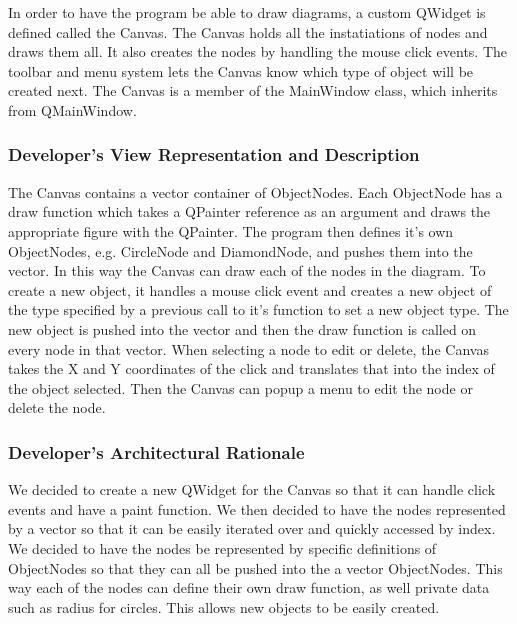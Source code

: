 \documentclass[twoside,letterpaper]{article}
\begin{document}
{{\color{black}
In order to have the program be able to draw diagrams, a custom QWidget
is defined called the Canvas. The Canvas holds all the instatiations of
nodes and draws them all. It also creates the nodes by handling the
mouse click events. The toolbar and menu system lets the Canvas know
which type of object will be created next. The Canvas is a member of
the MainWindow class, which inherits from QMainWindow. }

\subsubsection[Developer{\textquoteright}s View Representation and
Description ]{Developer{\textquoteright}s View Representation and
Description }

{\color{black}
The Canvas contains a vector container of
ObjectNodes. Each ObjectNode has a draw function which takes a QPainter
reference as an argument and draws the appropriate figure with the
QPainter. The program then defines it's own ObjectNodes, e.g. CircleNode
and DiamondNode, and pushes them into the vector. In this way the Canvas
can draw each of the nodes in the diagram. To create a new object, it
handles a mouse click event and creates a new object of the type specified
by a previous call to it's function to set a new object type. The new
object is pushed into the vector and then the draw function is called
on every node in that vector. When selecting a node to edit or delete,
the Canvas takes the X and Y coordinates of the click and translates that
into the index of the object selected. Then the Canvas can popup a menu
to edit the node or delete the node. }


\subsubsection{Developer{\textquoteright}s Architectural Rationale}

{\color{black}
We decided to create a new QWidget for the Canvas so that it can handle
click events and have a paint function. We then decided to have the nodes
represented by a vector so that it can be easily iterated over and quickly
accessed by index. We decided to have the nodes be represented by specific
definitions of ObjectNodes so that they can all be pushed into the a vector
ObjectNodes. This way each of the nodes can define their own draw function,
as well private data such as radius for circles. This allows new objects to
be easily created. }

}
\end{document}
